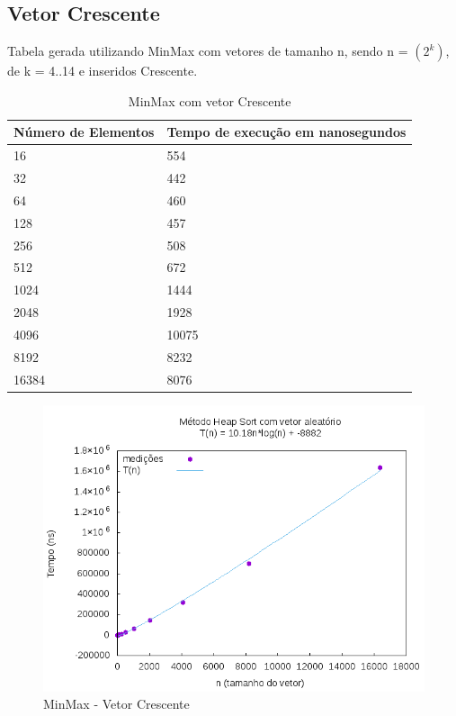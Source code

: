 \documentclass[12pt,a4paper,twoside]{report}
\begin{document}
\subsection{Vetor Crescente}
Tabela gerada utilizando MinMax com vetores de tamanho n, sendo n = $(2^k)$, de k = 4..14 e inseridos Crescente.
\begin{table}[H]
\centering
\caption{MinMax com vetor Crescente}
\label{my-label}
\begin{tabular}{|l|l|}
\hline
\multicolumn{1}{|c|}{\textbf{Número de Elementos}} & \multicolumn{1}{c|}{\textbf{Tempo de execução em nanosegundos}} \\ \hline
16 & 554 \\ \hline
32 & 442 \\ \hline
64 & 460 \\ \hline
128 & 457 \\ \hline
256 & 508 \\ \hline
512 & 672 \\ \hline
1024 & 1444 \\ \hline
2048 & 1928 \\ \hline
4096 & 10075 \\ \hline
8192 & 8232 \\ \hline
16384 & 8076 \\ \hline
\end{tabular}
\end{table}

\begin{figure}[H]
    \centering
    \includegraphics[width=0.7\linewidth]{graficos/HeapSort/vIntAleatorio/vIntAleatorio.png}
  \caption{MinMax - Vetor Crescente}
\end{figure}
\end{document}
